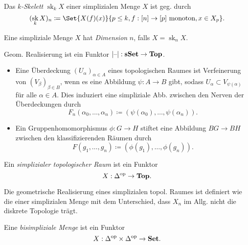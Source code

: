 \documentclass{cheat-sheet}
\DeclareMathOperator{\sk}{sk} %
\begin{document}
\begin{defn}
  Das \emph{$k$-Skelett} $\sk_k X$ einer simplizialen Menge $X$ ist geg. durch
  \[ (\sk_k X)_n \coloneqq \Set{ X(f)(x) }{ p \leq k, f : [n] \to [p] \text{ monoton}, x \in X_p }. \]
\end{defn}

\begin{defn}
  Eine simpliziale Menge $X$ hat \emph{Dimension} $n$, falls $X = \sk_n X$.
\end{defn}

\begin{prop}
  Geom. Realisierung ist ein Funktor $\lvert\text{--}\rvert : \mathbf{sSet} \to \mathbf{Top}$.
\end{prop}

\begin{bspe}
  \begin{itemize}
    \item Eine Überdeckung $(U_\alpha)_{\alpha \in A}$ eines topologischen Raumes ist Verfeinerung von $(V_\beta)_{\beta \in B}$, wenn es eine Abbildung $\psi : A \to B$ gibt, sodass $U_\alpha \subset V_{\psi(\alpha)}$ für alle $\alpha \in A$. Dies induziert eine simpliziale Abb. zwischen den Nerven der Überdeckungen durch
    \[ F_n(\alpha_0, \ldots, \alpha_n) \coloneqq (\psi(\alpha_0), \ldots, \psi(\alpha_n)). \]
    \item Ein Gruppenhomomorphismus $\phi : G \to H$ stiftet eine Abbildung $BG \to BH$ zwischen den klassifizierenden Räumen durch
    \[ F(g_1, \ldots, g_n) \coloneqq (\phi(g_1), \ldots, \phi(g_n)). \]
  \end{itemize}
\end{bspe}


\begin{defn}
  Ein \emph{simplizialer topologischer Raum} ist ein Funktor
  \[ X : \Delta^{\mathrm{op}} \to \mathbf{Top}. \]
\end{defn}

\begin{bem}
  Die geometrische Realisierung eines simplizialen topol. Raumes ist definiert wie die einer simplizialen Menge mit dem Unterschied, dass $X_n$ im Allg. nicht die diskrete Topologie trägt.
\end{bem}

\begin{defn}
  Eine \emph{bisimpliziale Menge} ist ein Funktor
  \[ X : \Delta^{\mathrm{op}} \times \Delta^{\mathrm{op}} \to \mathbf{Set}. \]
\end{defn}
\end{document}
